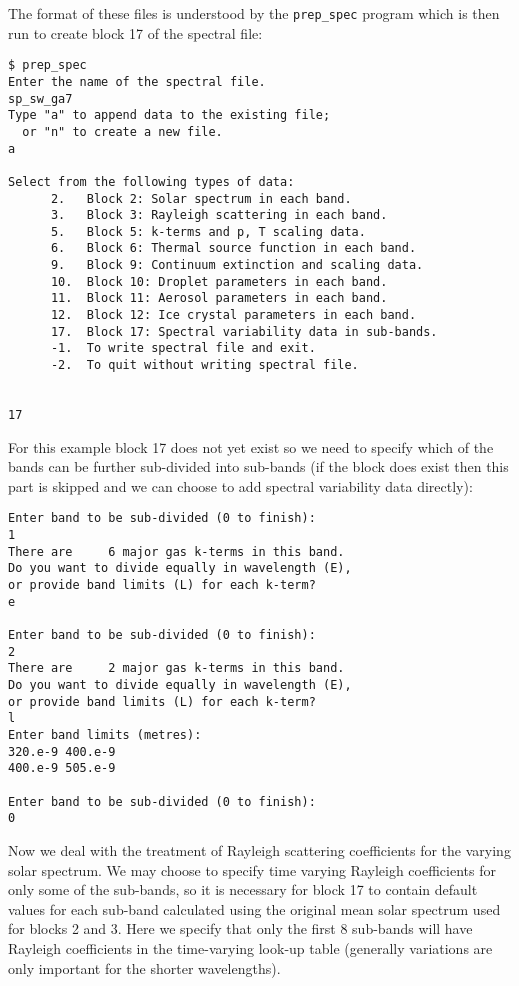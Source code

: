 \noindent The format of these files is understood by the {\tt prep\_spec} program which is then run to create block 17 of the spectral file:

{\small
\begin{verbatim}
$ prep_spec
Enter the name of the spectral file.
sp_sw_ga7
Type "a" to append data to the existing file;
  or "n" to create a new file.
a

Select from the following types of data:
      2.   Block 2: Solar spectrum in each band.
      3.   Block 3: Rayleigh scattering in each band.
      5.   Block 5: k-terms and p, T scaling data.
      6.   Block 6: Thermal source function in each band.
      9.   Block 9: Continuum extinction and scaling data.
      10.  Block 10: Droplet parameters in each band.
      11.  Block 11: Aerosol parameters in each band.
      12.  Block 12: Ice crystal parameters in each band.
      17.  Block 17: Spectral variability data in sub-bands.
      -1.  To write spectral file and exit.
      -2.  To quit without writing spectral file.


17
\end{verbatim}
}

\noindent For this example block 17 does not yet exist so we need to specify which of the bands can be further sub-divided into sub-bands (if the block does exist then this part is skipped and we can choose to add spectral variability data directly):

{\small
\begin{verbatim}
Enter band to be sub-divided (0 to finish): 
1
There are     6 major gas k-terms in this band.
Do you want to divide equally in wavelength (E),
or provide band limits (L) for each k-term?
e

Enter band to be sub-divided (0 to finish): 
2
There are     2 major gas k-terms in this band.
Do you want to divide equally in wavelength (E),
or provide band limits (L) for each k-term?
l
Enter band limits (metres): 
320.e-9 400.e-9
400.e-9 505.e-9

Enter band to be sub-divided (0 to finish): 
0
\end{verbatim}
}

\noindent Now we deal with the treatment of Rayleigh scattering coefficients for the varying solar spectrum. We may choose to specify time varying Rayleigh coefficients for only some of the sub-bands, so it is necessary for block 17 to contain default values for each sub-band calculated using the original mean solar spectrum used for blocks 2 and 3. Here we specify that only the first 8 sub-bands will have Rayleigh coefficients in the time-varying look-up table (generally variations are only important for the shorter wavelengths).

